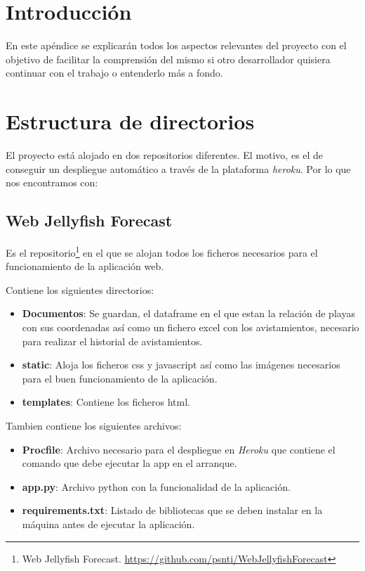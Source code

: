 
\section{Introducción}
En este apéndice se explicarán todos los aspectos relevantes del proyecto con el objetivo de facilitar la comprensión del mismo si otro desarrollador quisiera continuar con el trabajo o entenderlo más a fondo.

\section{Estructura de directorios}

El proyecto está alojado en dos repositorios diferentes. El motivo, es el de conseguir un despliegue automático a través de la plataforma \emph{heroku}. Por lo que nos encontramos con:

\subsection{Web Jellyfish Forecast}
Es el repositorio\footnote{Web Jellyfish Forecast. \url{https://github.com/psnti/WebJellyfishForecast}} en el que se alojan todos los ficheros necesarios para el funcionamiento de la aplicación web.

Contiene los siguientes directorios:
\begin{itemize}
	\item \textbf{Documentos}: Se guardan, el dataframe en el que estan la relación de playas con sus coordenadas así como un fichero excel con los avistamientos, necesario para realizar el historial de avistamientos.
	\item \textbf{static}: Aloja los ficheros css y javascript así como las imágenes necesarios para el buen funcionamiento de la aplicación.
	\item \textbf{templates}: Contiene los ficheros html.
\end{itemize}

Tambien contiene los siguientes archivos:
\begin{itemize}
	\item \textbf{Procfile}: Archivo necesario para el despliegue en \emph{Heroku} que contiene el comando que debe ejecutar la app en el arranque.
	\item \textbf{app.py}: Archivo python con la funcionalidad de la aplicación.
	\item \textbf{requirements.txt}: Listado de bibliotecas que se deben instalar en la máquina antes de ejecutar la aplicación.
\end{itemize}

